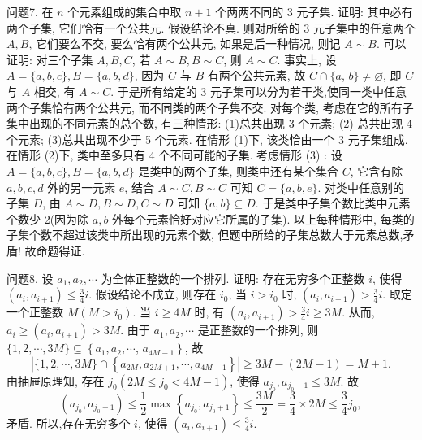 问题7. 在 $n$ 个元素组成的集合中取 $n+1$ 个两两不同的 3 元子集.
证明: 其中必有两个子集, 它们恰有一个公共元.
假设结论不真.
则对所给的 3 元子集中的任意两个 $A, B$, 它们要么不交, 要么恰有两个公共元, 如果是后一种情况, 则记 $A \sim B$.
可以证明: 对三个子集 $A, B, C$, 若 $A \sim B, B \sim C$, 则 $A \sim C$. 事实上, 设 $A=\{a, b, c\}, B=\{a, b, d\}$, 因为 $C$ 与 $B$ 有两个公共元素, 故 $C \cap\{a$, $b\} \neq \varnothing$, 即 $C$ 与 $A$ 相交, 有 $A \sim C$. 于是所有给定的 3 元子集可以分为若干类,使同一类中任意两个子集恰有两个公共元, 而不同类的两个子集不交.
对每个类, 考虑在它的所有子集中出现的不同元素的总个数, 有三种情形:
(1)总共出现 3 个元素;
(2) 总共出现 4 个元素;
(3)总共出现不少于 5 个元素.
在情形 (1)下, 该类恰由一个 3 元子集组成.
在情形 (2)下, 类中至多只有 4 个不同可能的子集.
考虑情形 (3) : 设 $A=\{a, b, c\}, B=\{a, b, d\}$ 是类中的两个子集, 则类中还有某个集合 $C$, 它含有除 $a, b, c, d$ 外的另一元素 $e$, 结合 $A \sim C, B \sim C$ 可知 $C=\{a, b, e\}$. 对类中任意别的子集 $D$, 由 $A \sim D, B \sim D, C \sim D$ 可知 $\{a, b\} \subseteq D$. 于是类中子集个数比类中元素个数少 2(因为除 $a, b$ 外每个元素恰好对应它所属的子集).
以上每种情形中, 每类的子集个数不超过该类中所出现的元素个数, 但题中所给的子集总数大于元素总数,矛盾! 故命题得证.



问题8. 设 $a_1, a_2, \cdots$ 为全体正整数的一个排列.
证明: 存在无穷多个正整数 $i$, 使得 $\left(a_i, a_{i+1}\right) \leqslant \frac{3}{4} i$. 
假设结论不成立, 则存在 $i_0$, 当 $i>i_0$ 时, $\left(a_i, a_{i+1}\right)>\frac{3}{4} i$.
取定一个正整数 $M\left(M>i_0\right)$. 当 $i \geqslant 4 M$ 时, 有 $\left(a_i, a_{i+1}\right)>\frac{3}{4} i \geqslant 3 M$. 从而, $a_i \geqslant\left(a_i, a_{i+1}\right)>3 M$.
由于 $a_1, a_2, \cdots$ 是正整数的一个排列, 则 $\{1,2, \cdots, 3 M\} \subseteq\left\{a_1, a_2, \cdots\right.$, $\left.a_{4 M-1}\right\}$, 故
$$
\left|\{1,2, \cdots, 3 M\} \cap\left\{a_{2 M}, a_{2 M+1}, \cdots, a_{4 M-1}\right\}\right| \geqslant 3 M-(2 M-1)=M+1 .
$$
由抽屉原理知, 存在 $j_0\left(2 M \leqslant j_0<4 M-1\right)$, 使得 $a_{j_0}, a_{j_0+1} \leqslant 3 M$. 故
$$
\left(a_{j_0}, a_{j_0+1}\right) \leqslant \frac{1}{2} \max \left\{a_{j_0}, a_{j_0+1}\right\} \leqslant \frac{3 M}{2}=\frac{3}{4} \times 2 M \leqslant \frac{3}{4} j_0,
$$
矛盾.
所以,存在无穷多个 $i$, 使得 $\left(a_i, a_{i+1}\right) \leqslant \frac{3}{4} i$.


